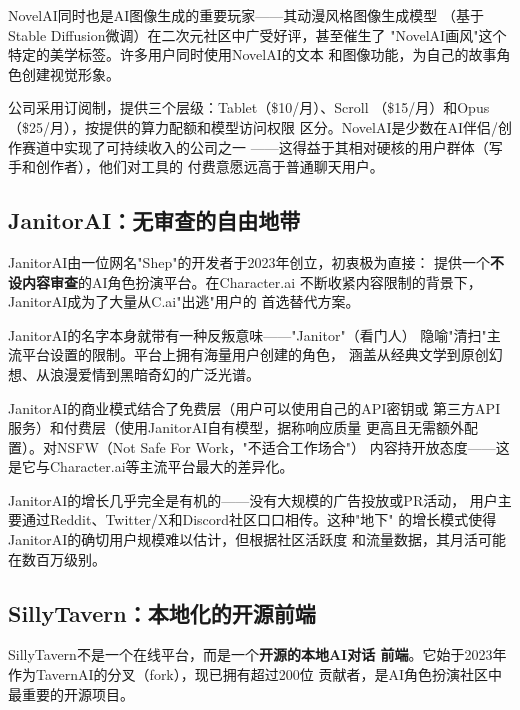 NovelAI同时也是AI图像生成的重要玩家——其动漫风格图像生成模型
（基于Stable Diffusion微调）在二次元社区中广受好评，甚至催生了
"NovelAI画风"这个特定的美学标签。许多用户同时使用NovelAI的文本
和图像功能，为自己的故事角色创建视觉形象。

公司采用订阅制，提供三个层级：Tablet（\$10/月）、Scroll
（\$15/月）和Opus（\$25/月），按提供的算力配额和模型访问权限
区分。NovelAI是少数在AI伴侣/创作赛道中实现了可持续收入的公司之一
——这得益于其相对硬核的用户群体（写手和创作者），他们对工具的
付费意愿远高于普通聊天用户。

\subsection{JanitorAI：无审查的自由地带}
\label{subsec:janitorai}

JanitorAI由一位网名"Shep"的开发者于2023年创立，初衷极为直接：
提供一个\textbf{不设内容审查}的AI角色扮演平台。在Character.ai
不断收紧内容限制的背景下，JanitorAI成为了大量从C.ai"出逃"用户的
首选替代方案。

JanitorAI的名字本身就带有一种反叛意味——"Janitor"（看门人）
隐喻"清扫"主流平台设置的限制。平台上拥有海量用户创建的角色，
涵盖从经典文学到原创幻想、从浪漫爱情到黑暗奇幻的广泛光谱。

JanitorAI的商业模式结合了免费层（用户可以使用自己的API密钥或
第三方API服务）和付费层（使用JanitorAI自有模型，据称响应质量
更高且无需额外配置）。对NSFW（Not Safe For Work，"不适合工作场合"）
内容持开放态度——这是它与Character.ai等主流平台最大的差异化。

JanitorAI的增长几乎完全是有机的——没有大规模的广告投放或PR活动，
用户主要通过Reddit、Twitter/X和Discord社区口口相传。这种"地下"
的增长模式使得JanitorAI的确切用户规模难以估计，但根据社区活跃度
和流量数据，其月活可能在数百万级别。

\subsection{SillyTavern：本地化的开源前端}
\label{subsec:sillytavern}

SillyTavern不是一个在线平台，而是一个\textbf{开源的本地AI对话
前端}。它始于2023年作为TavernAI的分叉（fork），现已拥有超过200位
贡献者，是AI角色扮演社区中最重要的开源项目。

